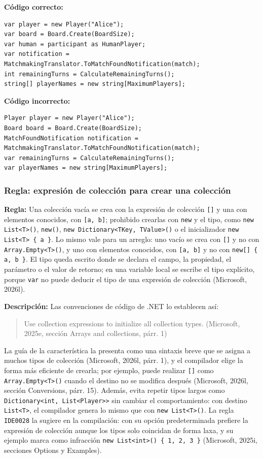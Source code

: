 \textbf{Código correcto:}
\begin{lstlisting}[style=csharpstyle]
var player = new Player("Alice");
var board = Board.Create(BoardSize);
var human = participant as HumanPlayer;
var notification = MatchmakingTranslator.ToMatchFoundNotification(match);
int remainingTurns = CalculateRemainingTurns();
string[] playerNames = new string[MaximumPlayers];
\end{lstlisting}

\textbf{Código incorrecto:}
\begin{lstlisting}[style=csharpstyle,basicstyle=\ttfamily\scriptsize]
Player player = new Player("Alice");
Board board = Board.Create(BoardSize);
MatchFoundNotification notification = MatchmakingTranslator.ToMatchFoundNotification(match);
var remainingTurns = CalculateRemainingTurns();
var playerNames = new string[MaximumPlayers];
\end{lstlisting}

\subsubsection{Regla: expresión de colección para crear una colección}

\textbf{Regla:} Una colección vacía se crea con la expresión de colección \texttt{[]} y una con elementos conocidos, con \texttt{[a, b]}; prohibido crearlas con \texttt{new} y el tipo, como \texttt{new List<T>()}, \texttt{new()}, \texttt{new Dictionary<TKey, TValue>()} o el inicializador \texttt{new List<T> \{ a \}}. Lo mismo vale para un arreglo: uno vacío se crea con \texttt{[]} y no con \texttt{Array.Empty<T>()}, y uno con elementos conocidos, con \texttt{[a, b]} y no con \texttt{new[] \{ a, b \}}. El tipo queda escrito donde se declara el campo, la propiedad, el parámetro o el valor de retorno; en una variable local se escribe el tipo explícito, porque \texttt{var} no puede deducir el tipo de una expresión de colección (Microsoft, 2026l).

\textbf{Descripción:} Las convenciones de código de .NET lo establecen así:
\begin{quote}
Use collection expressions to initialize all collection types. (Microsoft, 2025e, sección Arrays and collections, párr. 1)
\end{quote}
\noindent La guía de la característica la presenta como una sintaxis breve que se asigna a muchos tipos de colección (Microsoft, 2026l, párr. 1), y el compilador elige la forma más eficiente de crearla; por ejemplo, puede realizar \texttt{[]} como \texttt{Array.Empty<T>()} cuando el destino no se modifica después (Microsoft, 2026l, sección Conversions, párr. 15). Además, evita repetir tipos largos como \texttt{Dictionary<int, List<Player>{}>} sin cambiar el comportamiento: con destino \texttt{List<T>}, el compilador genera lo mismo que con \texttt{new List<T>()}. La regla \texttt{IDE0028} la sugiere en la compilación: con su opción predeterminada prefiere la expresión de colección aunque los tipos solo coincidan de forma laxa, y su ejemplo marca como infracción \texttt{new List<int>() \{ 1, 2, 3 \}} (Microsoft, 2025i, secciones Options y Examples).

